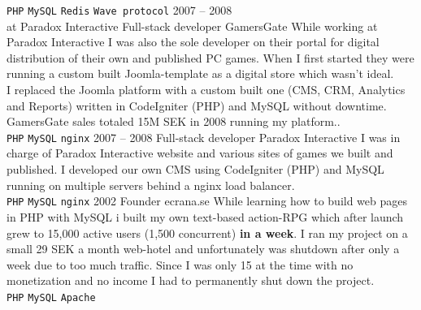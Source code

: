 \documentclass[9pt]{template} %
\begin{document}
\begin{entrylist}
{      \texttt{PHP}\slashsep
      \texttt{MySQL}\slashsep
      \texttt{Redis}\slashsep
      \texttt{Wave protocol}
    }
  \entry
    {2007 -- 2008\\\footnotesize{at Paradox Interactive}}
    {Full-stack developer}
    {GamersGate}
    {While working at Paradox Interactive I was also the sole developer on their portal for digital distribution of their own and published PC games. When I first started they were running a custom built Joomla-template as a digital store which wasn’t ideal.\\
      I replaced the Joomla platform with a custom built one (CMS, CRM, Analytics and Reports) written in CodeIgniter (PHP) and MySQL without downtime.\\
      GamersGate sales totaled 15M SEK in 2008 running my platform..\\
      \texttt{PHP}\slashsep
      \texttt{MySQL}\slashsep
      \texttt{nginx}
    }
  \entry
    {2007 -- 2008}
    {Full-stack developer}
    {Paradox Interactive}
    {I was in charge of Paradox Interactive website and various sites of games we built and published. I developed our own CMS using CodeIgniter (PHP) and MySQL running on multiple servers behind a nginx load balancer.\\
      \texttt{PHP}\slashsep
      \texttt{MySQL}\slashsep
      \texttt{nginx}
    }
  \entry
    {2002}
    {Founder}
    {ecrana.se}
    {While learning how to build web pages in PHP with MySQL i built my own text-based action-RPG which after launch grew to 15,000 active users (1,500 concurrent) \textbf{in a week}. I ran my project on a small 29 SEK a month web-hotel and unfortunately was shutdown after only a week due to too much traffic. Since I was only 15 at the time with no monetization and no income I had to permanently shut down the project.\\
      \texttt{PHP}\slashsep
      \texttt{MySQL}\slashsep
      \texttt{Apache}
    }
\end{entrylist}

\pagebreak

\end{document}
